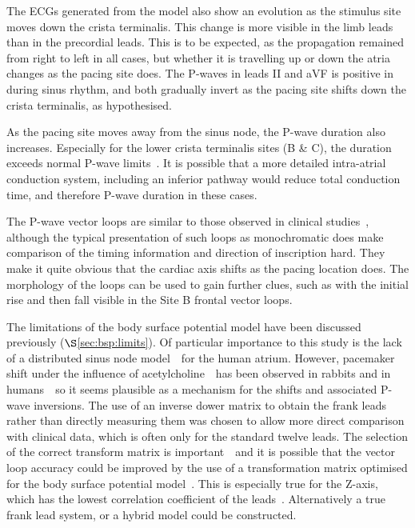 The ECGs generated from the model also show an evolution as the stimulus site
moves down the crista terminalis.
This change is more visible in the limb leads than in the precordial leads.
This is to be expected, as the propagation remained from right to left in all
cases, but whether it is travelling up or down the atria changes as the pacing
site does.
The P-waves in leads II and aVF is positive in during sinus rhythm, and both
gradually invert as the pacing site shifts down the crista terminalis, as
hypothesised.

As the pacing site moves away from the sinus node, the P-wave duration also
increases.
Especially for the lower crista terminalis sites (B \& C), the duration exceeds
normal P-wave limits~\cite{Lemery2004,MacFarlane1989b}.
It is possible that a more detailed intra-atrial conduction system, including an
inferior pathway would reduce total conduction time, and therefore P-wave
duration in these cases.

The P-wave vector loops are similar to those observed in clinical
studies~\cite{Carlson2005,Holmqvist2007,Havmoller2007,Guillem2008}, although the typical
presentation of such loops as monochromatic does make comparison of the timing
information and direction of inscription hard.
They make it quite obvious that the cardiac axis shifts as the pacing location
does.
The morphology of the loops can be used to gain further clues, such as with the
initial rise and then fall visible in the Site B frontal vector loops.

The limitations of the body surface potential model have been discussed
previously ($\S$\ref{sec:bsp:limits}).
Of particular importance to this study is the lack of a distributed sinus node
model~\cite{Yamamoto2006,Dobrzynski2005}\ for the human atrium.
However, pacemaker shift under the influence of
acetylcholine~\cite{Shibata2001}\ has been observed in rabbits and in
humans~\cite{Opthof1988}\ so it seems plausible as a mechanism for the shifts
and associated P-wave inversions.
The use of an inverse dower matrix to obtain the frank leads rather than
directly measuring them was chosen to allow more direct comparison with clinical
data, which is often only for the standard twelve leads.
The selection of the correct transform matrix is
important~\cite{Guillem2008,Luo1991b,Hyttinen1995}\ and it is possible that the
vector loop accuracy could be improved by the use of a transformation matrix
optimised for the body surface potential model~\cite{Oosterom2007}.
This is especially true for the Z-axis, which has the lowest correlation
coefficient of the leads~\cite{Hyttinen1995}.
Alternatively a true frank lead system, or a hybrid model could be constructed.

